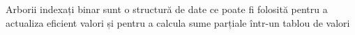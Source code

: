 
Arborii indexați binar sunt o structură de date ce poate fi folosită pentru a actualiza eficient valori și pentru a calcula sume parțiale într-un tablou de valori